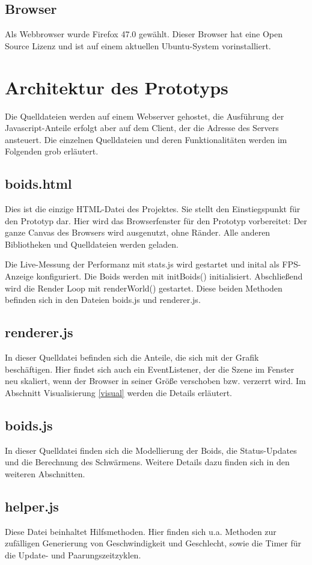 \documentclass[draft=false
              ,paper=a4
              ,twoside=false
              ,fontsize=11pt
              ,headsepline
              ,BCOR10mm
              ,DIV11
              ,bibtotoc
              ,liststotoc
              ]{scrbook}
\begin{document}
\subsection{Browser}
Als Webbrowser wurde Firefox 47.0 gewählt. Dieser Browser hat eine Open Source Lizenz und ist auf einem aktuellen Ubuntu-System vorinstalliert.
\section{Architektur des Prototyps}
Die Quelldateien werden auf einem Webserver gehostet, die Ausführung der Javascript-Anteile erfolgt aber auf dem Client, der die Adresse des Servers ansteuert.
Die einzelnen Quelldateien und deren Funktionalitäten werden im Folgenden grob erläutert.
\subsection{boids.html}
Dies ist die einzige HTML-Datei des Projektes. Sie stellt den Einstiegspunkt für den Prototyp dar. Hier wird das Browserfenster für den Prototyp vorbereitet: Der ganze Canvas des Browsers wird ausgenutzt, ohne Ränder. Alle anderen Bibliotheken und Quelldateien werden geladen.

Die Live-Messung der Performanz mit stats.js wird gestartet und inital als FPS-Anzeige konfiguriert.
Die Boids werden mit initBoids() initialisiert. Abschließend wird die Render Loop mit renderWorld() gestartet. Diese beiden Methoden befinden sich in den Dateien boids.js und renderer.js.
\subsection{renderer.js}
In dieser Quelldatei befinden sich die Anteile, die sich mit der Grafik beschäftigen. Hier findet sich auch ein EventListener, der die Szene im Fenster neu skaliert, wenn der Browser in seiner Größe verschoben bzw. verzerrt wird. Im Abschnitt Visualisierung \ref{visual} werden die Details erläutert.
\subsection{boids.js}
In dieser Quelldatei finden sich die Modellierung der Boids, die Status-Updates und die Berechnung des Schwärmens. Weitere Details dazu finden sich in den weiteren Abschnitten.
\subsection{helper.js}
Diese Datei beinhaltet Hilfsmethoden. Hier finden sich u.a. Methoden zur zufälligen Generierung von Geschwindigkeit und Geschlecht, sowie die Timer für die Update- und Paarungszeitzyklen.
\end{document}
